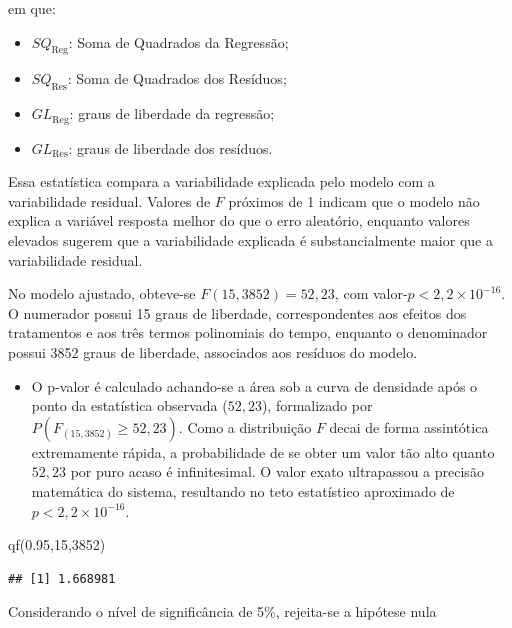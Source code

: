 \documentclass[
  brazilian,
  12pt,
  a4paper,
]{article}
\newenvironment{Shaded}{\begin{snugshade}}{\end{snugshade}}
\newcommand{\DecValTok}[1]{\textcolor[rgb]{0.68,0.00,0.00}{#1}}
\newcommand{\FloatTok}[1]{\textcolor[rgb]{0.68,0.00,0.00}{#1}}
\newcommand{\FunctionTok}[1]{\textcolor[rgb]{0.28,0.35,0.67}{#1}}
\newcommand{\NormalTok}[1]{\textcolor[rgb]{0.00,0.46,0.62}{#1}}
\begin{document}
em que:

\begin{itemize}
    \item \(SQ_{\text{Reg}}\): Soma de Quadrados da Regressão;
    \item \(SQ_{\text{Res}}\): Soma de Quadrados dos Resíduos;
    \item \(GL_{\text{Reg}}\): graus de liberdade da regressão;
    \item \(GL_{\text{Res}}\): graus de liberdade dos resíduos.
\end{itemize}

Essa estatística compara a variabilidade explicada pelo modelo com a
variabilidade residual. Valores de \(F\) próximos de 1 indicam que o
modelo não explica a variável resposta melhor do que o erro aleatório,
enquanto valores elevados sugerem que a variabilidade explicada é
substancialmente maior que a variabilidade residual.

No modelo ajustado, obteve-se \(F(15,3852)=52,23\), com
valor-\(p < 2,2\times10^{-16}\). O numerador possui 15 graus de
liberdade, correspondentes aos efeitos dos tratamentos e aos três termos
polinomiais do tempo, enquanto o denominador possui 3852 graus de
liberdade, associados aos resíduos do modelo.

\begin{itemize}  
\item O p-valor é calculado achando-se a área sob a curva de densidade após o ponto da estatística observada ($52,23$), formalizado por $P(F_{(15, 3852)} \ge 52,23)$. Como a distribuição $F$ decai de forma assintótica extremamente rápida, a probabilidade de se obter um valor tão alto quanto $52,23$ por puro acaso é infinitesimal. O valor exato ultrapassou a precisão matemática do sistema, resultando no teto estatístico aproximado de $p < 2,2 \times 10^{-16}$.
\end{itemize}

\begin{Shaded}
\begin{Highlighting}[]
\FunctionTok{qf}\NormalTok{(}\FloatTok{0.95}\NormalTok{,}\DecValTok{15}\NormalTok{,}\DecValTok{3852}\NormalTok{)}
\end{Highlighting}
\end{Shaded}

\begin{verbatim}
## [1] 1.668981
\end{verbatim}

Considerando o nível de significância de 5\%, rejeita-se a hipótese nula
\end{document}
